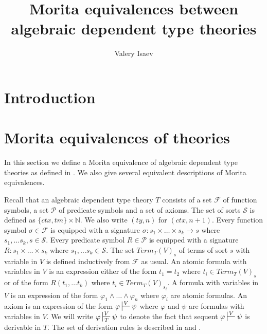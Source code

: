 \documentclass[reqno]{amsart}
\theoremstyle{definition}
\theoremstyle{remark}
\numberwithin{figure}{section}
\begin{document}
\title{Morita equivalences between algebraic dependent type theories}

\author{Valery Isaev}

\begin{abstract}
\end{abstract}

\maketitle

 \makeatletter
    \providecommand\@dotsep{5}
  \makeatother
  \listoftodos\relax

\section{Introduction}

\section{Morita equivalences of theories}

In this section we define a Morita equivalence of algebraic dependent type theories as defined in \cite{alg-tt}.
We also give several equivalent descriptions of Morita equivalences.

Recall that an algebraic dependent type theory $T$ consists of a set $\mathcal{F}$ of function symbols, a set $\mathcal{P}$ of predicate symbols and a set of axioms.
The set of sorts $\mathcal{S}$ is defined as $\{ ctx, tm \} \times \mathbb{N}$.
We also write $(ty,n)$ for $(ctx,n+1)$.
Every function symbol $\sigma \in \mathcal{F}$ is equipped with a signature $\sigma : s_1 \times \ldots \times s_k \to s$ where $s_1, \ldots s_k, s \in \mathcal{S}$.
Every predicate symbol $R \in \mathcal{P}$ is equipped with a signature $R : s_1 \times \ldots \times s_k$ where $s_1, \ldots s_k \in \mathcal{S}$.
The set $Term_T(V)_s$ of terms of sort $s$ with variable in $V$ is defined inductively from $\mathcal{F}$ as usual.
An atomic formula with variables in $V$ is an expression either of the form $t_1 = t_2$  where $t_i \in Term_T(V)_s$ or of the form $R(t_1, \ldots t_k)$ where $t_i \in Term_T(V)_{s_i}$.
A formula with variables in $V$ is an expression of the form $\varphi_1 \land \ldots \land \varphi_n$ where $\varphi_i$ are atomic formulas.
An axiom is an expression of the form $\varphi \sststile{}{V} \psi$ where $\varphi$ and $\psi$ are formulas with variables in $V$.
We will write $\varphi \sststile{T}{V} \psi$ to denote the fact that sequent $\varphi \sststile{}{V} \psi$ is derivable in $T$.
The set of derivation rules is described in \cite{PHL} and \cite{alg-tt}.
\end{document}
